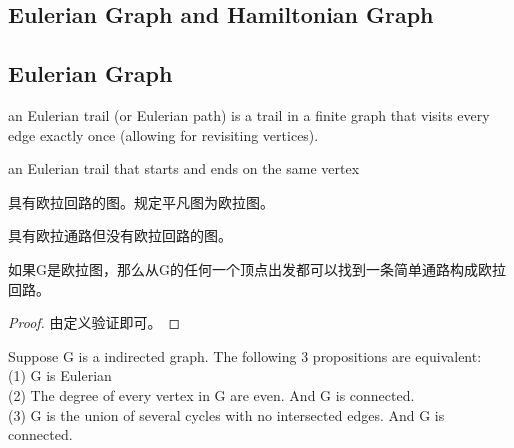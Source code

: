 \documentclass[11pt,fleqn]{book} %
\begin{document}
\begin{CJK}{UTF8}{gkai}
\chapter{Eulerian Graph and Hamiltonian Graph}
\section{Eulerian Graph}
\begin{definition}
     an Eulerian trail (or Eulerian path) is a trail in a finite graph that visits every edge exactly once (allowing for revisiting vertices).
\end{definition}
\begin{definition}
     an Eulerian trail that starts and ends on the same vertex
\end{definition}

\begin{definition}
     具有欧拉回路的图。规定平凡图为欧拉图。
\end{definition}
\begin{definition}
    [半欧拉图] 具有欧拉通路但没有欧拉回路的图。
\end{definition}

\begin{lemma}
    如果G是欧拉图，那么从G的任何一个顶点出发都可以找到一条简单通路构成欧拉回路。
\end{lemma}
\begin{proof}
    由定义验证即可。
\end{proof}

\begin{theorem}
    Suppose G is a indirected graph. The following 3 propositions are equivalent: \\
    (1) G is Eulerian \\
    (2) The degree of every vertex in G are even. And G is connected.\\ 
    (3) G is the union of several cycles with no intersected edges. And G is connected.


\end{theorem}
\end{CJK}
\end{document}
